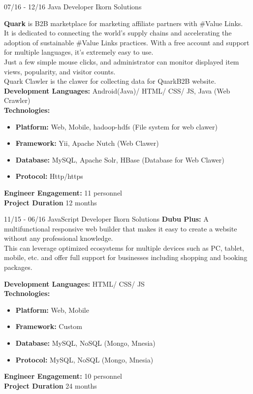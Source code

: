 \documentclass[]{friggeri-cv}
\begin{document}
\begin{entrylist}
\entry
    {07/16 - 12/16}
    {Java Developer}
    {Ikorn Solutions}
	{\textbf{ Quark}  is B2B marketplace for marketing affiliate partners with \#Value Links.\\ 
	It is dedicated to connecting the world’s supply chains and accelerating the adoption of sustainable \#Value Links practices.
	With a free account and support for multiple languages, it’s extremely easy to use.\\
	 Just a few simple mouse clicks, and administrator can monitor displayed item views, popularity, and visitor counts.\\
	Quark Clawler is the clawer for collecting data  for QuarkB2B website.\\

	 \textbf{Development Languages:} Android(Java)/ HTML/ CSS/ JS, Java (Web Crawler) \\ 
	 \textbf{Technologies:}~
			\begin{itemize}
				\item \textbf{Platform:} Web,  Mobile, hadoop-hdfs (File system for web clawer)
				\item \textbf{Framework:} Yii, Apache Nutch (Web Clawer)
				\item \textbf{Database:} MySQL, Apache Solr, HBase (Database for Web Clawer)
				\item \textbf{Protocol:} Http/https
			\end{itemize}
		 \textbf{Engineer Engagement:} 11 personnel\\
		 \textbf{Project Duration} 12  months~
	}
\end{entrylist}

\begin{entrylist}
\entry
    {11/15 - 06/16}
    {JavaScript Developer}
    {Ikorn Solutions}
	{\textbf{ Dubu Plus: } A multifunctional responsive web builder that makes it easy to create a website without any professional knowledge.
	\\ This can leverage optimized ecosystems for multiple devices such as PC, tablet, mobile, etc. and offer full support for businesses including shopping and booking packages.\\
}
\end{entrylist}

\begin{entrylist}
\entry
{}
{}
{}
{
		 \textbf{Development Languages:} HTML/ CSS/ JS~\\
		 \textbf{Technologies:}~
			\begin{itemize}
				\item \textbf{Platform:} Web,  Mobile
				\item \textbf{Framework:} Custom
				\item \textbf{Database:} MySQL, NoSQL (Mongo, Mnesia)
				\item \textbf{Protocol:} MySQL, NoSQL (Mongo, Mnesia)
			\end{itemize}
		 \textbf{Engineer Engagement:} 10 personnel\\
		 \textbf{Project Duration} 24  months\\
	}
\end{entrylist}
\end{document}
